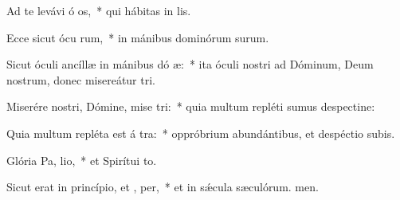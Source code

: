 \item Ad te levávi ó os,~* qui hábitas in lis.
\item Ecce sicut ócu rum,~* in mánibus dominórum surum.
\item Sicut óculi ancíllæ in mánibus dó æ:~* ita óculi nostri ad Dóminum, Deum nostrum, donec misereátur tri.
\item Miserére nostri, Dómine, mise tri:~* quia multum repléti sumus despectine:
\item Quia multum repléta est á tra:~* oppróbrium abundántibus, et despéctio subis.
\item Glória Pa,  lio,~* et Spirítui to.
\item Sicut erat in princípio, et ,  per,~* et in sǽcula sæculórum. men.
